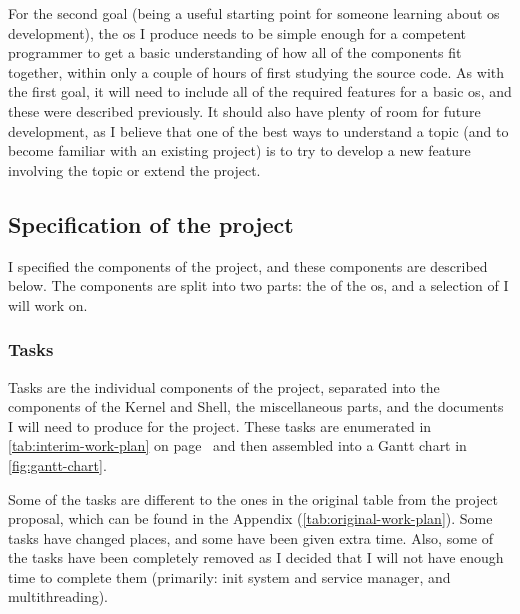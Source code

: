 \documentclass{article}
\begin{document}
For the second goal (being a useful starting point for someone learning about
\gls{os} development), the \gls{os} I produce needs to be simple enough for a
competent programmer to get a basic understanding of how all of the components
fit together, within only a couple of hours of first studying the source code.
As with the first goal, it will need to include all of the required features
for a basic \gls{os}, and these were described previously. It should also have
plenty of room for future development, as I believe that one of the best ways
to understand a topic (and to become familiar with an existing project) is to
try to develop a new feature involving the topic or extend the project.


\subsection{Specification of the project}
I specified the components of the project, and these components are described
below. The components are split into two parts: the  of the
\gls{os}, and a selection of  I will work on.

\subsubsection{Tasks}
\label{sec:tasks}
Tasks are the individual components of the project, separated into the
components of the Kernel and Shell, the miscellaneous parts, and the documents
I will need to produce for the project. These tasks are enumerated in
\autoref{tab:interim-work-plan} on page~\pageref*{tab:interim-work-plan} and
then assembled into a Gantt chart in \autoref{fig:gantt-chart}.

Some of the tasks are different to the ones in the original table from the
project proposal, which can be found in the Appendix
(\autoref{tab:original-work-plan}). Some tasks have changed places, and some
have been given extra time. Also, some of the tasks have been completely
removed as I decided that I will not have enough time to complete them
(primarily: init system and service manager, and multithreading).
\end{document}

